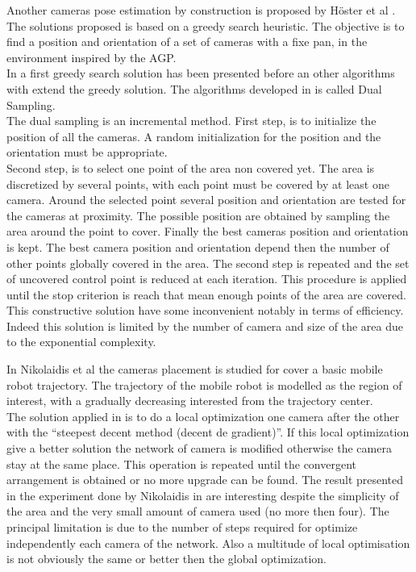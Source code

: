 Another cameras pose estimation by construction is proposed by Höster et al \cite{171*horster2006}.
The solutions proposed is based on a greedy search heuristic. The objective is to find a position and orientation of a set of cameras with a fixe pan, in the environment inspired by the AGP. \\
In \cite{171*horster2006} a first greedy search solution has been presented before an other algorithms with extend the greedy solution. The algorithms developed in \cite{171*horster2006} is called Dual Sampling.\\
The dual sampling is an incremental method. 
First step, is to initialize the position of all the cameras. A random initialization for the position and the orientation must be appropriate.  \\
Second step, is to select one point of the area non covered yet. The area is discretized by several points, with each point must be covered by at least one camera. Around the selected point several position and orientation are tested for the cameras at proximity. The possible position are obtained by sampling the area around the point to cover. Finally the best cameras position and orientation is kept. The best camera position and orientation depend then the number of other points globally covered in the area. 
The second step is repeated and the set of uncovered control point is reduced at each iteration. This procedure is applied until the stop criterion is reach that mean enough points of the area are covered. \\
This constructive solution have some inconvenient notably in terms of efficiency. Indeed this solution is limited by the number of camera and size of the area due to the exponential complexity. %

In Nikolaidis et al \cite{81*nikolaidis2009} the cameras placement is studied for cover a basic mobile robot trajectory.
The trajectory of the mobile robot is modelled as the region of interest, with a gradually decreasing interested from the trajectory center.\\
  The solution applied in \cite{81*nikolaidis2009} is to do a local optimization one camera after the other with the “steepest decent method (decent de gradient)”. If this local optimization give a better solution the network of camera is modified otherwise the camera stay at the same place. This operation is repeated until the convergent arrangement is obtained or no more upgrade can be found. The result presented in the experiment done by Nikolaidis in  \cite{81*nikolaidis2009} are interesting despite the simplicity of the area and the very small amount of camera used (no more then four). The principal limitation is due to the number of steps required for optimize independently each camera of the network. Also a multitude of local optimisation is not obviously the same or better then the global optimization.

